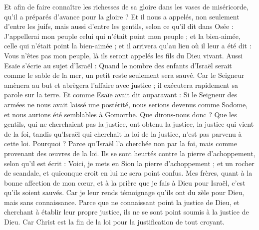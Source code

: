 \begin{multicols}{2}
Et afin de faire connaître les richesses de sa gloire dans les vases de miséricorde, qu'il a préparés d'avance pour la gloire ?
Et il nous a appelés, non seulement d'entre les juifs, mais aussi d'entre les gentils,
selon ce qu'il dit dans Osée : J'appellerai mon peuple celui qui n'était point mon peuple ; et la bien-aimée, celle qui n'était point la bien-aimée ;
et il arrivera qu'au lieu où il leur a été dit : Vous n’êtes pas mon peuple, là ils seront appelés les fils du Dieu vivant.
Aussi Esaïe s'écrie au sujet d'Israël : Quand le nombre des enfants d'Israël serait comme le sable de la mer, un petit reste seulement sera sauvé.
Car le Seigneur amènera au but et abrègera l'affaire avec justice ; il exécutera rapidement sa parole sur la terre.
Et comme Esaïe avait dit auparavant : Si le Seigneur des armées ne nous avait laissé une postérité, nous serions devenus comme Sodome, et nous aurions été semblables à Gomorrhe.
Que dirons-nous donc ? Que les gentils, qui ne cherchaient pas la justice, ont obtenu la justice, la justice qui vient de la foi,
tandis qu’Israël qui cherchait la loi de la justice, n'est pas parvenu à cette loi.
Pourquoi ? Parce qu’Israël l’a cherchée non par la foi, mais comme provenant des œuvres de la loi. Ils se sont heurtés contre la pierre d'achoppement,
selon qu’il est écrit : Voici, je mets en Sion la pierre d'achoppement ; et un rocher de scandale, et quiconque croit en lui ne sera point confus.
\VerseOne{}Mes frères, quant à la bonne affection de mon cœur, et à la prière que je fais à Dieu pour Israël, c’est qu’ils soient sauvés.
Car je leur rends témoignage qu'ils ont du zèle pour Dieu, mais sans connaissance.
Parce que ne connaissant point la justice de Dieu, et cherchant à établir leur propre justice, ils ne se sont point soumis à la justice de Dieu.
Car Christ est la fin de la loi pour la justification de tout croyant.

\end{multicols}
